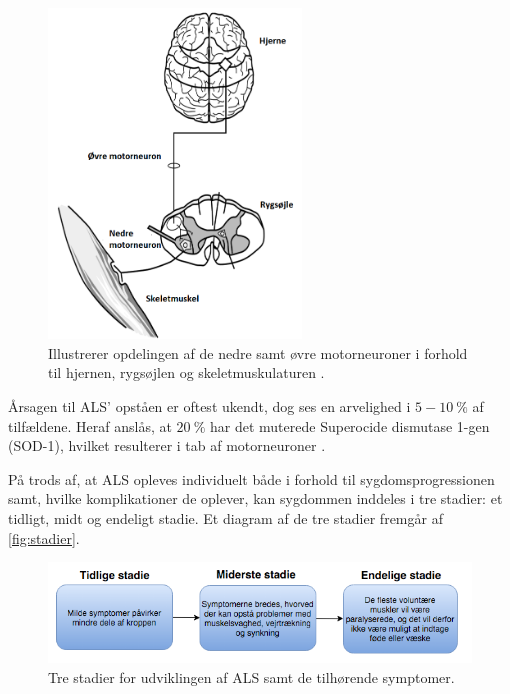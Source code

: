 \begin{figure}[H]
\centering
\includegraphics[width=0.6\textwidth]{figures/motorneuroner.png}
\caption{Illustrerer opdelingen af de nedre samt øvre motorneuroner i forhold til hjernen, rygsøjlen og skeletmuskulaturen \citep{miller2005}.}
\label{fig:motorneuroner}
\end{figure}

\noindent
Årsagen til ALS' opståen er oftest ukendt, dog ses en arvelighed i $5 - 10~\%$ af tilfældene. Heraf anslås, at $20~\%$ har det muterede Superocide dismutase 1-gen (SOD-1), hvilket resulterer i tab af motorneuroner \citep{miller2005}.

På trods af, at ALS opleves individuelt både i forhold til sygdomsprogressionen samt, hvilke komplikationer de oplever, kan sygdommen inddeles i tre stadier: et tidligt, midt og endeligt stadie. Et diagram af de tre stadier fremgår af \autoref{fig:stadier}.

\begin{figure}[H]
\centering
\includegraphics[width=1\textwidth]{figures/stadier.png}
\caption{Tre stadier for udviklingen af ALS samt de tilhørende symptomer.}
\label{fig:stadier}
\end{figure}

